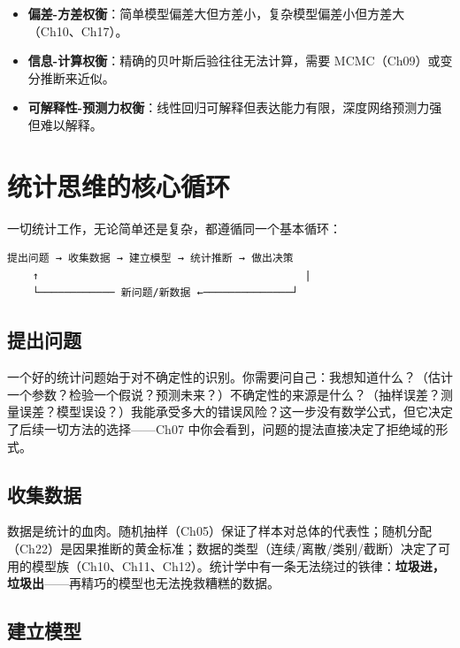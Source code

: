 \documentclass[
]{book}
\providecommand{\tightlist}{%
  \setlength{\itemsep}{0pt}\setlength{\parskip}{0pt}}
\begin{document}
\begin{itemize}
\tightlist
\item
  \textbf{偏差-方差权衡}：简单模型偏差大但方差小，复杂模型偏差小但方差大（Ch10、Ch17）。
\item
  \textbf{信息-计算权衡}：精确的贝叶斯后验往往无法计算，需要 MCMC（Ch09）或变分推断来近似。
\item
  \textbf{可解释性-预测力权衡}：线性回归可解释但表达能力有限，深度网络预测力强但难以解释。
\end{itemize}

\section{统计思维的核心循环}\label{ux7edfux8ba1ux601dux7ef4ux7684ux6838ux5fc3ux5faaux73af}

一切统计工作，无论简单还是复杂，都遵循同一个基本循环：

\begin{verbatim}
提出问题 → 收集数据 → 建立模型 → 统计推断 → 做出决策
    ↑                                          |
    └──────────── 新问题/新数据 ←──────────────┘
\end{verbatim}

\subsection{提出问题}\label{ux63d0ux51faux95eeux9898}

一个好的统计问题始于对不确定性的识别。你需要问自己：我想知道什么？（估计一个参数？检验一个假说？预测未来？）不确定性的来源是什么？（抽样误差？测量误差？模型误设？）我能承受多大的错误风险？这一步没有数学公式，但它决定了后续一切方法的选择------Ch07 中你会看到，问题的提法直接决定了拒绝域的形式。

\subsection{收集数据}\label{ux6536ux96c6ux6570ux636e}

数据是统计的血肉。随机抽样（Ch05）保证了样本对总体的代表性；随机分配（Ch22）是因果推断的黄金标准；数据的类型（连续/离散/类别/截断）决定了可用的模型族（Ch10、Ch11、Ch12）。统计学中有一条无法绕过的铁律：\textbf{垃圾进，垃圾出}------再精巧的模型也无法挽救糟糕的数据。

\subsection{建立模型}\label{ux5efaux7acbux6a21ux578b}
\end{document}
